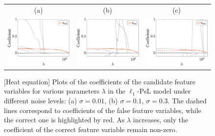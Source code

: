 \documentclass[a4paper,11pt]{article}
\begin{document}
\begin{figure}
\centering
\begin{tabular}{ccc}
(a)&(b)&(c)\\
\includegraphics[width=2in]{Figures/heat_0_01.eps}&
\includegraphics[width=2in]{Figures/heat_0_1.eps}&
\includegraphics[width=2in]{Figures/heat_0_3.eps}
\end{tabular}	
\caption{[Heat equation] Plots of the coefficients of the candidate feature variables for various parameters $\lambda$ in the $\ell_1$-PsL model under different noise levels: (a) $\sigma=0.01$, (b) $\sigma=0.1$, $\sigma=0.3$. The dashed lines correspond to coefficients of the false feature variables, while the correct one is highlighted by red. As $\lambda$ increases, only the coefficient of the correct feature variable remain non-zero.}\label{expr.heat}
\end{figure}

%
%
\end{document}
